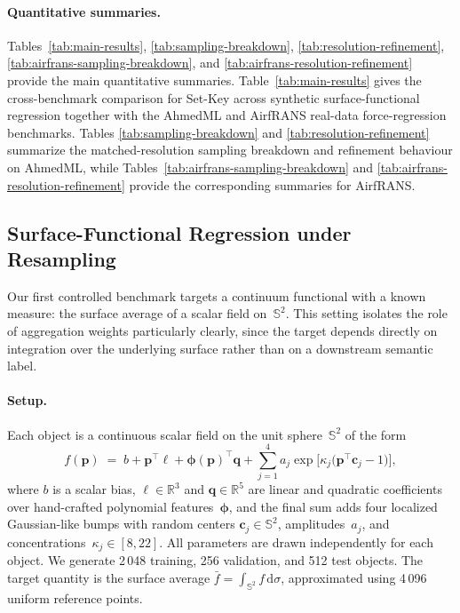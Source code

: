 \documentclass[11pt]{article}
\begin{document}
\paragraph{Quantitative summaries.}
Tables~\ref{tab:main-results}, \ref{tab:sampling-breakdown},
\ref{tab:resolution-refinement}, \ref{tab:airfrans-sampling-breakdown}, and
\ref{tab:airfrans-resolution-refinement} provide the main quantitative
summaries.  Table~\ref{tab:main-results} gives the cross-benchmark comparison
for Set-Key across synthetic surface-functional regression together with the
AhmedML and AirfRANS real-data force-regression benchmarks.  Tables
\ref{tab:sampling-breakdown} and \ref{tab:resolution-refinement} summarize the
matched-resolution sampling breakdown and refinement behaviour on AhmedML,
while Tables~\ref{tab:airfrans-sampling-breakdown} and
\ref{tab:airfrans-resolution-refinement} provide the corresponding summaries
for AirfRANS.



\subsection{Surface-Functional Regression under Resampling}
\label{sec:exp-regression}

Our first controlled benchmark targets a continuum functional with a known
measure: the surface average of a scalar field on~$\mathbb{S}^2$.  This setting
isolates the role of aggregation weights particularly clearly, since the target
depends directly on integration over the underlying surface rather than on a
downstream semantic label.

\paragraph{Setup.}
Each object is a continuous scalar field on the unit sphere~$\mathbb{S}^2$ of
the form
\begin{equation}\label{eq:sphere-field}
  f(\mathbf{p})
  \;=\;
  b
  + \mathbf{p}^\top \boldsymbol{\ell}
  + \boldsymbol{\phi}(\mathbf{p})^\top \mathbf{q}
  + \sum_{j=1}^{4}
      a_j \exp\!\bigl[\kappa_j\bigl(\mathbf{p}^\top \mathbf{c}_j - 1\bigr)\bigr],
\end{equation}
where $b$ is a scalar bias, $\boldsymbol{\ell}\in\mathbb{R}^3$ and
$\mathbf{q}\in\mathbb{R}^5$ are linear and quadratic coefficients over
hand-crafted polynomial features~$\boldsymbol{\phi}$, and the final sum adds
four localized Gaussian-like bumps with random centers
$\mathbf{c}_j\in\mathbb{S}^2$, amplitudes~$a_j$, and
concentrations~$\kappa_j\in[8,22]$.  All parameters are drawn independently
for each object.  We generate 2\,048 training, 256 validation, and 512 test
objects.  The target quantity is the surface average
$\bar{f}=\int_{\mathbb{S}^2} f\,\mathrm{d}\sigma$, approximated using 4\,096
uniform reference points.
\end{document}
